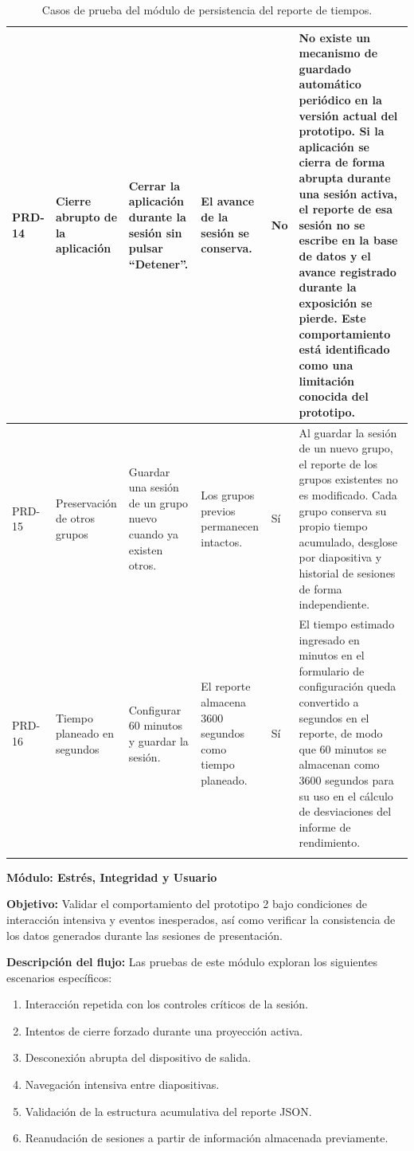 \documentclass[11pt]{article}
\begin{document}
{\begin{longtable}{@{}|L{1.2cm}|L{2.5cm}|L{3.4cm}|L{3.8cm}|L{1.5cm}|L{2.3cm}|@{}}
PRD-14 & Cierre abrupto de la aplicación & Cerrar la aplicación durante la sesión sin pulsar ``Detener''. & El avance de la sesión se conserva. & No & No existe un mecanismo de guardado automático periódico en la versión actual del prototipo. Si la aplicación se cierra de forma abrupta durante una sesión activa, el reporte de esa sesión no se escribe en la base de datos y el avance registrado durante la exposición se pierde. Este comportamiento está identificado como una limitación conocida del prototipo. \\ \hline
PRD-15 & Preservación de otros grupos & Guardar una sesión de un grupo nuevo cuando ya existen otros. & Los grupos previos permanecen intactos. & Sí & Al guardar la sesión de un nuevo grupo, el reporte de los grupos existentes no es modificado. Cada grupo conserva su propio tiempo acumulado, desglose por diapositiva y historial de sesiones de forma independiente. \\ \hline
PRD-16 & Tiempo planeado en segundos & Configurar 60 minutos y guardar la sesión. & El reporte almacena 3600 segundos como tiempo planeado. & Sí & El tiempo estimado ingresado en minutos en el formulario de configuración queda convertido a segundos en el reporte, de modo que 60 minutos se almacenan como 3600 segundos para su uso en el cálculo de desviaciones del informe de rendimiento. \\ \hline
\caption{Casos de prueba del módulo de persistencia del reporte de tiempos.}
\label{tab:casos-prueba-modulo-reporte}
\end{longtable}
}


\clearpage
\textbf{Módulo: Estrés, Integridad y Usuario}

\textbf{Objetivo:} Validar el comportamiento del prototipo 2 bajo condiciones de interacción intensiva y eventos inesperados, así como verificar la consistencia de los datos generados durante las sesiones de presentación.

\textbf{Descripción del flujo:} Las pruebas de este módulo exploran los siguientes escenarios específicos:
\begin{enumerate}
    \item Interacción repetida con los controles críticos de la sesión.
    \item Intentos de cierre forzado durante una proyección activa.
    \item Desconexión abrupta del dispositivo de salida.
    \item Navegación intensiva entre diapositivas.
    \item Validación de la estructura acumulativa del reporte JSON.
    \item Reanudación de sesiones a partir de información almacenada previamente.
\end{enumerate}
\end{document}
